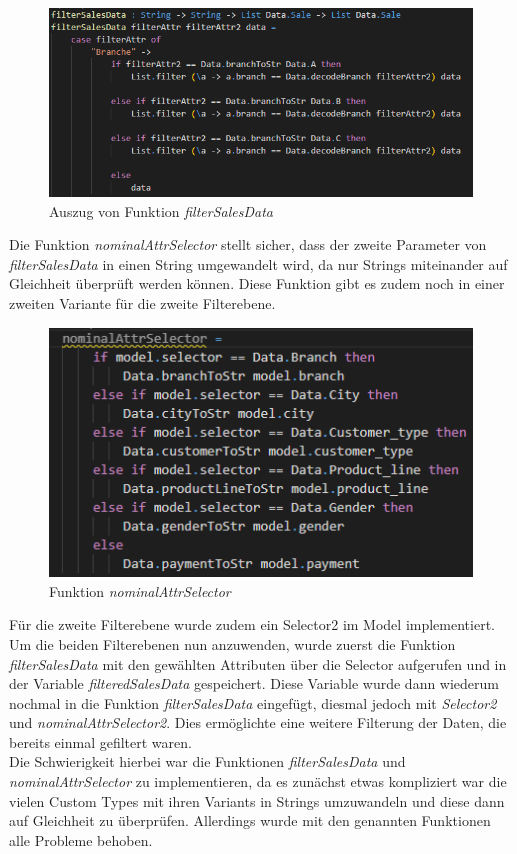 \documentclass[usegeometry=true]{scrartcl}
\begin{document}
\begin{figure} [H]
	\begin{center}
		\includegraphics[width=14cm]{IMG/filterSalesData}
		\caption{Auszug von Funktion \textit{filterSalesData}}
		\label{fig:filterSalesData}
	\end{center}
\end{figure}

\noindent Die Funktion \textit{nominalAttrSelector} stellt sicher, dass der zweite Parameter von \textit{filterSalesData} in einen String umgewandelt wird, da nur Strings miteinander
auf Gleichheit überprüft werden können. Diese Funktion gibt es zudem noch in einer zweiten Variante für die zweite Filterebene.
\begin{figure} [H]
	\begin{center}
		\includegraphics[width=12cm]{IMG/nominalAttrSelector}
		\caption{Funktion \textit{nominalAttrSelector}}
		\label{fig:filterSalesData}
	\end{center}
\end{figure}

\noindent Für die zweite Filterebene wurde zudem ein Selector2 im Model implementiert. Um die beiden Filterebenen nun anzuwenden, wurde zuerst die Funktion \textit{filterSalesData} mit
den gewählten Attributen über die Selector aufgerufen und in der Variable \textit{filteredSalesData} gespeichert. Diese Variable wurde dann wiederum nochmal in die Funktion
\textit{filterSalesData} eingefügt, diesmal jedoch mit \textit{Selector2} und \textit{nominalAttrSelector2}. Dies ermöglichte eine weitere Filterung der Daten, die bereits
einmal gefiltert waren.\\
\noindent Die Schwierigkeit hierbei war die Funktionen \textit{filterSalesData} und \textit{nominalAttrSelector} zu implementieren, da es zunächst etwas kompliziert war die
vielen Custom Types mit ihren Variants in Strings umzuwandeln und diese dann auf Gleichheit zu überprüfen. Allerdings wurde mit den genannten Funktionen alle Probleme behoben.
\end{document}
